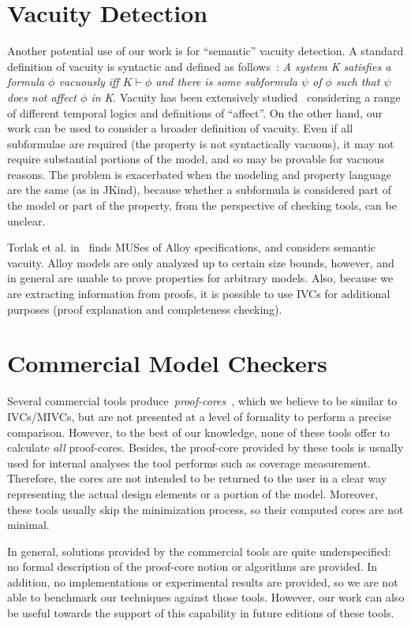 \section{Vacuity Detection}
Another potential use of our work is for ``semantic'' vacuity detection.  A standard definition of vacuity is syntactic and defined as follows~\cite{Kupferman:2006:SCF}: {\em A system K satisfies a formula $\phi$ vacuously iff $K \vdash \phi$ and there is some subformula $\psi$ of $\phi$ such that $\psi$ does not affect $\phi$ in K}.  Vacuity has been extensively studied~\cite{Gurfinkel:2012:RVB,Chockler2008,DBLP:Ben-DavidK13,Kupferman:2006:SCF,Chockler:2007,Beer1997} considering a range of different temporal logics and definitions of ``affect''.  On the other hand, our work can be used to consider a broader definition of vacuity.  Even if all subformulae are required (the property is not syntactically vacuous), it may not require substantial portions of the model, and so may be provable for vacuous reasons.  The problem is exacerbated when the modeling and property language are the same (as in JKind), because whether a subformula is considered part of the model or part of the property, from the perspective of checking tools, can be unclear.

Torlak et al. in~\cite{Torlak08:cores} finds MUSes of Alloy
specifications, and considers semantic vacuity.
 Alloy models are only analyzed up to certain
size bounds, however, and in general are unable to prove properties
for arbitrary models. Also, because we are extracting information from
proofs, it is possible to use IVCs for additional purposes (proof
explanation and completeness checking).


\section{Commercial Model Checkers}
Several commercial tools produce~\emph{proof-cores}~\cite{hanna2015formal, jasper_gold}, which we believe to be similar to IVCs/MIVCs, but are not presented at a level of formality to perform a precise comparison.  However, to the best of our knowledge, none of these tools offer to calculate \emph{all} proof-cores. Besides, the proof-core provided by these tools is usually used for internal analyses the tool performs such as coverage measurement. Therefore, the cores are not intended to be returned to the user in a clear way representing the actual design elements or a portion of the model. Moreover, these tools usually skip the minimization process, so their computed cores are not minimal. 

In general, solutions provided by the commercial tools are quite underspecified:
no formal description of the proof-core notion or algorithms are provided. In addition, no implementations or experimental results are provided, so we are not able to benchmark our techniques against those tools. However, our work can also be useful towards the support of this capability in future editions of these tools. 